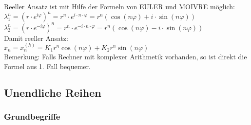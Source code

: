 Reeller Ansatz ist mit Hilfe der Formeln von EULER und MOIVRE möglich:\\
$\lambda_1^n= \left(r\cdot e^{i\varphi}\right)^n = r^n \cdot e^{i\cdot n \cdot \varphi} = r^n(\cos(n\varphi)+i\cdot \sin(n\varphi))$\\
$\lambda_2^n= \left(r\cdot e^{-i\varphi}\right)^n = r^n \cdot e^{-i\cdot n \cdot \varphi} = r^n(\cos(n\varphi)-i\cdot \sin(n\varphi))$\\
Damit reeller Ansatz:\\
$x_n=x_n^{(h)}=K_1 r^n \cos(n\varphi)+K_2 r^n \sin(n \varphi)$\\
Bemerkung: Falls Rechner mit komplexer Arithmetik vorhanden, so ist direkt die Formel aus 1. Fall bequemer.

\subsection{Unendliche Reihen} 
\subsubsection{Grundbegriffe}\label{2.1.3}
